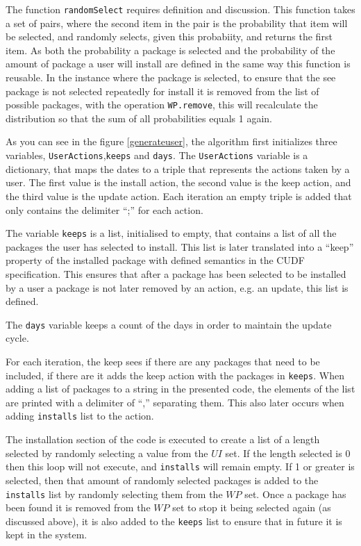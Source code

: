 The function \verb+randomSelect+ requires definition and discussion.
This function takes a set of pairs, where the second item in the pair is the probability that item will be selected,
and randomly selects, given this probabiity, and returns the first item.
As both the probability a package is selected and the probability of the amount of package a user will install are defined in the same way this function is reusable.
In the instance where the package is selected, to ensure that the see package is not selected repeatedly for install it is removed from the list of possible packages,
with the operation \verb+WP.remove+, this will recalculate the distribution so that the sum of all probabilities equals 1 again.

As you can see in the figure \ref{generateuser},
the algorithm first initializes three variables, \verb+UserActions+,\verb+keeps+ and \verb+days+.
The \verb+UserActions+ variable is a dictionary, that maps the dates to a triple that represents the actions taken by a user.
The first value is the install action, the second value is the keep action, and the third value is the update action.
Each iteration an empty triple is added that only contains the delimiter ``;'' for each action.

The variable \verb+keeps+ is a list, initialised to empty, that contains a list of all the packages the user has selected to install.
This list is later translated into a ``keep'' property of the installed package with defined semantics in the CUDF specification.
This ensures that after a package has been selected to be installed by a user a package is not later removed by an action, e.g. an update,
this list is defined.

The \verb+days+ variable keeps a count of the days in order to maintain the update cycle. 

For each iteration, the keep sees if there are any packages that need to be included, if there are it adds the keep action with the packages in \verb+keeps+.
When adding a list of packages to a string in the presented code, the elements of the list are printed with a delimiter of ``,'' separating them.
This also later occurs when adding \verb+installs+ list to the action.

The installation section of the code is executed to create a list of a length selected by randomly selecting a value from the $UI$ set.
If the length selected is 0 then this loop will not execute, and \verb+installs+ will remain empty.
If 1 or greater is selected, then that amount of randomly selected packages is added to the \verb+installs+ list by randomly selecting them from the $WP$ set.
Once a package has been found it is removed from the $WP$ set to stop it being selected again (as discussed above), it is also added to the \verb+keeps+ list to ensure that in future it is kept in the system.
 
